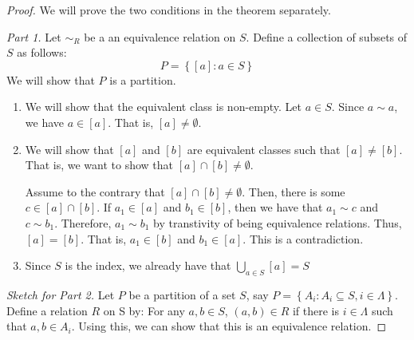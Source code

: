 \begin{proof}
    We will prove the two conditions in the theorem separately.

    \textit{Part 1.} Let \(\sim_R\) be a an equivalence relation on \(S\). Define a collection of subsets of \(S\) as follows:
    \[
        P = \left\{[a] : a \in S\right\}
    \]
    We will show that \(P\) is a partition.
    \begin{enumerate}
        \item We will show that the equivalent class is non-empty. Let \(a \in S\). Since \(a \sim a\), we have \(a \in [a]\). That is, \([a] \neq \emptyset\).
        \item We will show that \([a]\) and \([b]\) are equivalent classes such that \([a] \neq [b]\). That is, we want to show that \([a] \cap [b] \neq \emptyset\).

            Assume to the contrary that \([a] \cap [b] \neq \emptyset\). Then, there is some \(c \in [a] \cap [b]\). If \(a_1 \in [a]\) and \(b_1 \in [b]\), then we have that \(a_1 \sim c\) and \(c \sim b_1\). Therefore, \(a_1 \sim b_1\) by transtivity of being equivalence relations. Thus, \([a] = [b]\). That is, \(a_1 \in [b]\) and \(b_1 \in [a]\). This is a contradiction.

        \item Since \(S\) is the index, we already have that \(\bigcup_{a \in S} [a] = S\)
    \end{enumerate}

    \textit{Sketch for Part 2.} Let \(P\) be a partition of a set \(S\), say \(P = \left\{A_i : A_i \subseteq S, i \in \Lambda\right\}\). Define a relation \(R\) on S by: For any \(a, b \in S\), \((a, b) \in R\) if there is \(i \in \Lambda\) such that \(a, b \in A_i\). Using this, we can show that this is an equivalence relation.
\end{proof}
